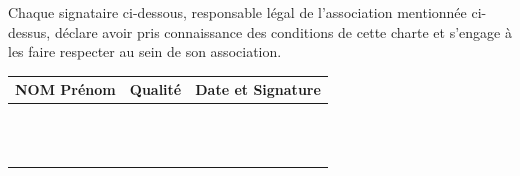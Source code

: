 \documentclass[11pt, a4paper]{article}
\begin{document}
\newpage

\noindent Chaque signataire ci-dessous, responsable légal de l'association mentionnée ci-dessus, déclare avoir pris connaissance des conditions de cette charte et s'engage à les faire respecter au sein de son association.

\vspace*{0.5cm}

\begin{table}[h]
	\centering
	\renewcommand{\arraystretch}{2}
	\small{
		\begin{tabular}{|p{6cm}|p{3cm}|p{6cm}|}
			\hline
			\rowcolor{black!10} NOM Prénom & Qualité & Date et Signature \\
			\hline
			                          &             &                   \\
			\hline
			                          &             &                   \\
			\hline
			                          &             &                   \\
			\hline
			                          &             &                   \\
			\hline
			                          &             &                   \\
			\hline
			                          &             &                   \\
			\hline
			                          &             &                   \\
			\hline
			                          &             &                   \\
			\hline
			                          &             &                   \\
			\hline
			                          &             &                   \\
			\hline
			                          &             &                   \\
			\hline
			                          &             &                   \\
			\hline
		\end{tabular}
	}
\end{table}
\end{document}
